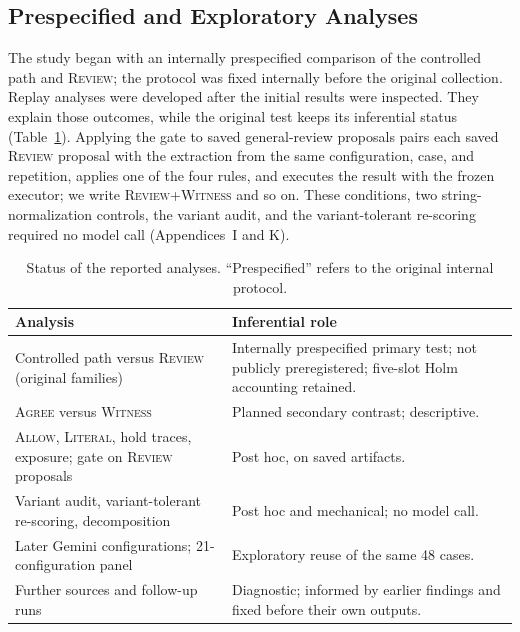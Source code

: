 \documentclass[acmsmall,review]{acmart}
\newcommand{\agree}{\textsc{Agree}}
\newcommand{\allow}{\textsc{Allow}}
\newcommand{\literal}{\textsc{Literal}}
\newcommand{\witness}{\textsc{Witness}}
\newcommand{\review}{\textsc{Review}}
\begin{document}
\subsection{Prespecified and Exploratory Analyses}\label{sec:analysis-status}
The study began with an internally prespecified comparison of the controlled path and \review{}; the protocol was fixed internally before the original collection. Replay analyses were developed after the initial results were inspected. They explain those outcomes, while the original test keeps its inferential status (Table~\ref{tab:5}). Applying the gate to saved general-review proposals pairs each saved \review{} proposal with the extraction from the same configuration, case, and repetition, applies one of the four rules, and executes the result with the frozen executor; we write \review{}+\witness{} and so on. These conditions, two string-normalization controls, the variant audit, and the variant-tolerant re-scoring required no model call (Appendices~I and K).

\begin{table}[tbp]
\centering
\caption{Status of the reported analyses. ``Prespecified'' refers to the original internal protocol.}\label{tab:5}
\small
\setlength{\tabcolsep}{3pt}
\begin{tabular}{@{}>{\raggedright\arraybackslash}p{}>{\raggedright\arraybackslash}p{}@{}}
\toprule
\textbf{Analysis} & \textbf{Inferential role} \\
\midrule
Controlled path versus \review{} (original families) & Internally prespecified primary test; not publicly preregistered; five-slot Holm accounting retained. \\
\agree{} versus \witness{} & Planned secondary contrast; descriptive. \\
\allow{}, \literal{}, hold traces, exposure; gate on \review{} proposals & Post hoc, on saved artifacts. \\
Variant audit, variant-tolerant re-scoring, decomposition & Post hoc and mechanical; no model call. \\
Later Gemini configurations; 21-configuration panel & Exploratory reuse of the same 48 cases. \\
Further sources and follow-up runs & Diagnostic; informed by earlier findings and fixed before their own outputs. \\
\bottomrule
\end{tabular}
\end{table}
\end{document}
